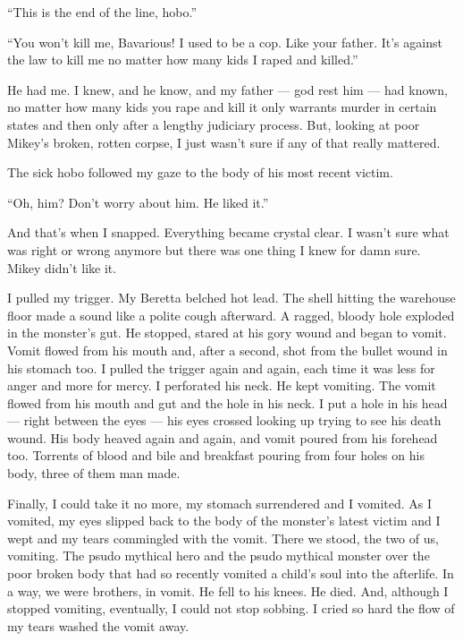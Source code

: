 ``This is the end of the line, hobo.''

``You won't kill me, Bavarious! I used to be a cop. Like
your father. It's against the law to kill me no matter how
many kids I raped and killed.''

He had me. I knew, and he know, and my father --- god rest him
--- had known, no matter how many kids you rape and kill it
only warrants murder in certain states and then only after a
lengthy judiciary process. But, looking at poor Mikey's
broken, rotten corpse, I just wasn't sure if any of that
really mattered.



The sick hobo followed my gaze to the body of his most recent
victim.



``Oh, him? Don't worry about him. He liked
it.''



And that's when I snapped. Everything became crystal clear. I
wasn't sure what was right or wrong anymore but there was one
thing I knew for damn sure. Mikey didn't like it.



I pulled my trigger. My Beretta belched hot lead. The shell hitting
the warehouse floor made a sound like a polite cough afterward. A
ragged, bloody hole exploded in the monster's gut. He
stopped, stared at his gory wound and began to vomit. Vomit flowed
from his mouth and, after a second, shot from the bullet wound in
his stomach too. I pulled the trigger again and again, each time it
was less for anger and more for mercy. I perforated his neck. He
kept vomiting. The vomit flowed from his mouth and gut and the hole
in his neck. I put a hole in his head --- right between the
eyes --- his eyes crossed looking up trying to see his death
wound. His body heaved again and again, and vomit poured from his
forehead too. Torrents of blood and bile and breakfast pouring from
four holes on his body, three of them man made.



Finally, I could take it no more, my stomach surrendered and I
vomited. As I vomited, my eyes slipped back to the body of the
monster's latest victim and I wept and my tears commingled
with the vomit. There we stood, the two of us, vomiting. The psudo
mythical hero and the psudo mythical monster over the poor broken
body that had so recently vomited a child's soul into the
afterlife. In a way, we were brothers, in vomit. He fell to his
knees. He died. And, although I stopped vomiting, eventually, I
could not stop sobbing. I cried so hard the flow of my tears washed
the vomit away. 
 



